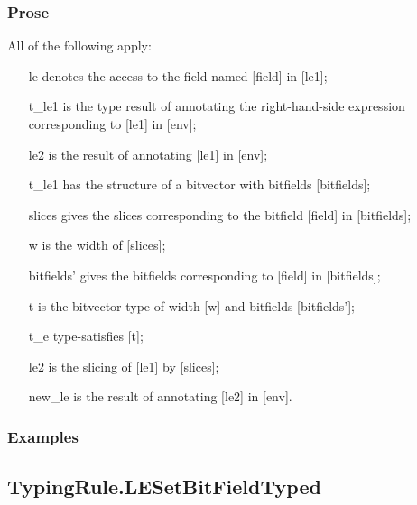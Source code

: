 \documentclass{book}
\begin{document}
    \subsubsection{Prose}
    All of the following apply:
   \begin{itemize}
   \item [le] denotes the access to the field named [field] in [le1];
   \item [t\_le1] is the type result of annotating the right-hand-side expression corresponding to [le1] in [env];
   \item [le2] is the result of annotating [le1] in [env];
   \item [t\_le1] has the structure of a bitvector with bitfields [bitfields];
   \item [slices] gives the slices corresponding to the bitfield [field] in
      [bitfields];
   \item [w] is the width of [slices];
   \item [bitfields'] gives the bitfields corresponding to [field] in [bitfields];
   \item [t] is the bitvector type of width [w] and bitfields [bitfields'];
   \item [t\_e] type-satisfies [t];
   \item [le2] is the slicing of [le1] by [slices];
   \item [new\_le] is the result of annotating [le2] in [env].
   \end{itemize}

    \subsubsection{Examples}

\subsection{TypingRule.LESetBitFieldTyped}
\end{document}

